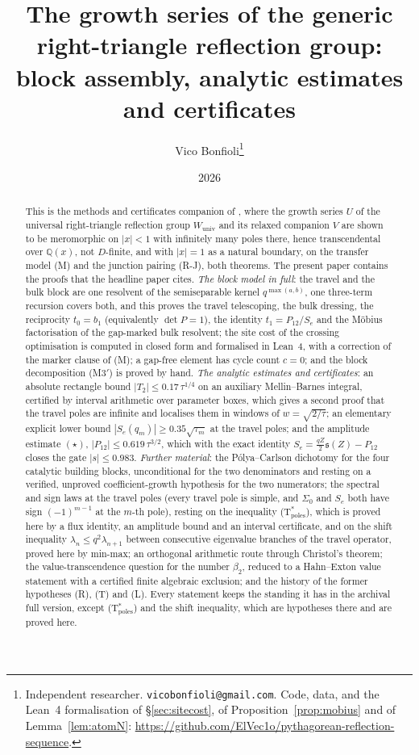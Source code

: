 \documentclass[11pt]{article}
\title{The growth series of the generic right-triangle reflection group:\\ block assembly,
analytic estimates and certificates}
\author{Vico Bonfioli\thanks{Independent researcher. \texttt{vicobonfioli@gmail.com}.
Code, data, and the Lean~4 formalisation of \S\ref{sec:sitecost}, of
Proposition~\ref{prop:mobius} and of Lemma~\ref{lem:atomN}:
\url{https://github.com/ElVec1o/pythagorean-reflection-sequence}.}}
\date{2026}
\theoremstyle{plain}
\theoremstyle{definition}
\theoremstyle{remark}
\newcommand{\Q}{\mathbb{Q}}
\begin{document}
\maketitle

\begin{abstract}
\noindent This is the methods and certificates companion of \cite{Bonfioli2026bA}, where the growth
series $U$ of the universal right-triangle reflection group $W_{\mathrm{univ}}$ and its relaxed
companion $V$ are shown to be meromorphic on $|x|<1$ with infinitely many poles there, hence
transcendental over $\Q(x)$, not $D$-finite, and with $|x|=1$ as a natural boundary, on the
transfer model \textup{(M)} and the junction pairing \textup{(R-J)}, both theorems. The present
paper contains the proofs that the headline paper cites. \emph{The block model in full}: the travel
and the bulk block are one resolvent of the semiseparable kernel $q^{\max(a,b)}$, one three-term
recursion covers both, and this proves the travel telescoping, the bulk dressing, the reciprocity
$t_0=b_1$ (equivalently $\det P=1$), the identity $t_1=P_{12}/S_e$ and the M\"obius factorisation
of the gap-marked bulk resolvent; the site cost of the crossing optimisation is computed in closed
form and formalised in Lean~4, with a correction of the marker clause of \textup{(M)}; a gap-free
element has cycle count $c=0$; and the block decomposition \textup{(M3$'$)} is proved by hand.
\emph{The analytic estimates and certificates}: an absolute rectangle bound $|T_2|\le0.17\,\tau^{1/4}$
on an auxiliary Mellin--Barnes integral, certified by interval arithmetic over parameter boxes,
which gives a second proof that the travel poles are infinite and localises them in windows of
$w=\sqrt{2/\tau}$; an elementary explicit lower bound $|S_e(q_m)|\ge0.35\sqrt{\tau_m}$ at the travel
poles; and the amplitude estimate $(\star)$, $|P_{12}|\le0.619\,\tau^{3/2}$, which with the exact
identity $S_e=\tfrac{qZ}2\mathfrak s(Z)-P_{12}$ closes the gate $|s|\le0.983$. \emph{Further
material}: the P\'olya--Carlson dichotomy for the four catalytic building blocks, unconditional for
the two denominators and resting on a verified, unproved coefficient-growth hypothesis for the two
numerators; the spectral and sign laws at the travel poles (every travel pole is simple, and
$\Sigma_0$ and $S_e$ both have sign $(-1)^{m-1}$ at the $m$-th pole), resting on the inequality
\textup{(T$^\ast_{\mathrm{poles}}$)}, which is proved here by a flux identity, an amplitude bound and
an interval certificate, and on the shift inequality $\lambda_n\le q^2\lambda_{n+1}$ between
consecutive eigenvalue branches of the travel operator, proved here by min-max; an orthogonal arithmetic route through Christol's theorem;
the value-transcendence question for the number $\beta_2$, reduced to a Hahn--Exton value statement
with a certified finite algebraic exclusion; and the history of the former hypotheses \textup{(R)},
\textup{(T)} and \textup{(L)}. Every statement keeps the standing it has in the archival full
version, except \textup{(T$^\ast_{\mathrm{poles}}$)} and the shift inequality, which are
hypotheses there and are proved here.
\end{abstract}
\end{document}
